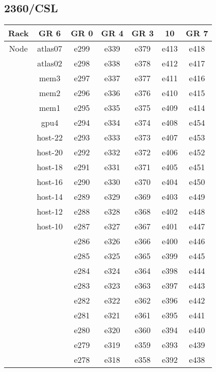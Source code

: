 \documentclass[10pt,letterpaper]{article}
\begin{document}
    \subsection{2360/CSL}
        \begin{center}
        \begin{tabular}{ |c|c|c|c|c|c|c| }
        \hline
        Rack & GR 6 & GR 0 & GR 4 & GR 3 & 10 & GR 7 \\
        \hline
        \multirow{1}{3em}{Node}

        & atlas07 & e299 & e339 & e379 & e413 & e418 \\
        & atlas02 & e298 & e338 & e378 & e412 & e417 \\
        & mem3    & e297 & e337 & e377 & e411 & e416 \\
        & mem2    & e296 & e336 & e376 & e410 & e415 \\
        & mem1    & e295 & e335 & e375 & e409 & e414 \\
        & gpu4    & e294 & e334 & e374 & e408 & e454 \\
        & host-22 & e293 & e333 & e373 & e407 & e453 \\
        & host-20 & e292 & e332 & e372 & e406 & e452 \\
        & host-18 & e291 & e331 & e371 & e405 & e451 \\
        & host-16 & e290 & e330 & e370 & e404 & e450 \\
        & host-14 & e289 & e329 & e369 & e403 & e449 \\
        & host-12 & e288 & e328 & e368 & e402 & e448 \\
        & host-10 & e287 & e327 & e367 & e401 & e447 \\
        &         & e286 & e326 & e366 & e400 & e446 \\
        &         & e285 & e325 & e365 & e399 & e445 \\
        &         & e284 & e324 & e364 & e398 & e444 \\
        &         & e283 & e323 & e363 & e397 & e443 \\
        &         & e282 & e322 & e362 & e396 & e442 \\
        &         & e281 & e321 & e361 & e395 & e441 \\
        &         & e280 & e320 & e360 & e394 & e440 \\
        &         & e279 & e319 & e359 & e393 & e439 \\
        &         & e278 & e318 & e358 & e392 & e438 \\

\end{tabular}
\end{center}
\end{document}

